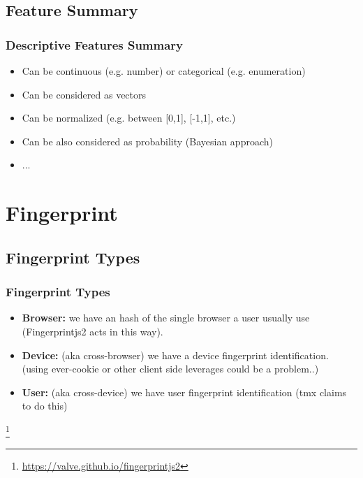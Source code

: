 \documentclass{beamer}
\begin{document}
\subsection{Feature Summary}
\begin{frame}
  \frametitle{Descriptive Features Summary}
    \begin{itemize}
	\item<+-> Can be continuous (e.g. number) or categorical (e.g. enumeration) 
	\item<+-> Can be considered as vectors
	\item<+-> Can be normalized (e.g. between [0,1], [-1,1], etc.)
	\item<+-> Can be also considered as probability (Bayesian approach)
	\item<+-> ...
   \end{itemize}
\end{frame}

\section{Fingerprint}
\subsection{Fingerprint Types}
\begin{frame}
  \frametitle{Fingerprint Types}
  \begin{itemize}
	\item<+-> \textbf{Browser:} we have an hash of the single browser a user usually use (Fingerprintjs2 acts in this way\footnotemark). 
	\item<+-> \textbf{Device:} (aka cross-browser) we have a device fingerprint identification. (using ever-cookie or other client side leverages could be a problem..)
	\item<+-> \textbf{User:} (aka cross-device) we have user fingerprint identification (tmx claims to do this)
   \end{itemize}
   \footnote[2]{ \href{https://valve.github.io/fingerprintjs2}{\url{https://valve.github.io/fingerprintjs2}} }
\end{frame}
\end{document}
